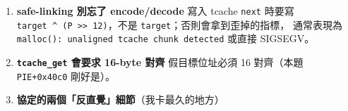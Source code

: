 \documentclass[10pt,a4paper]{article}
\begin{document}
\begin{enumerate}
  \textbf{\texttt{tcache\_\allowbreak{}key} 不是指標（glibc ≥ 2.34）}
  舊教學會說「free 後 chunk+8 是 \texttt{tcache} 指標，可以直接洩漏 heap
  base」。 2.34+ 之後那裡是\textbf{隨機值}，別被騙。本題改用
  safe-linking 的自我參照式解出 heap。
\item
  \textbf{safe-linking 別忘了 encode/decode} 寫入 tcache \texttt{next}
  時要寫
  \texttt{target\ \allowbreak{}\^\allowbreak{}{}\allowbreak{}\ \allowbreak{}(P\ \allowbreak{}\textgreater{}\allowbreak{}\textgreater{}\allowbreak{}\ \allowbreak{}12)}，不是
  \texttt{target}；否則會拿到歪掉的指標， 通常表現為
  \texttt{malloc():\allowbreak{}\ \allowbreak{}unaligned\ \allowbreak{}tcache\ \allowbreak{}chunk\ \allowbreak{}detected} 或直接
  SIGSEGV。
\item
  \textbf{\texttt{tcache\_\allowbreak{}get} 會要求 16-byte 對齊} 假目標位址必須 16
  對齊（本題 \texttt{PIE+0x40c0} 剛好是）。
\item
  \textbf{協定的兩個「反直覺」細節}（我卡最久的地方）


\end{enumerate}
\end{document}
